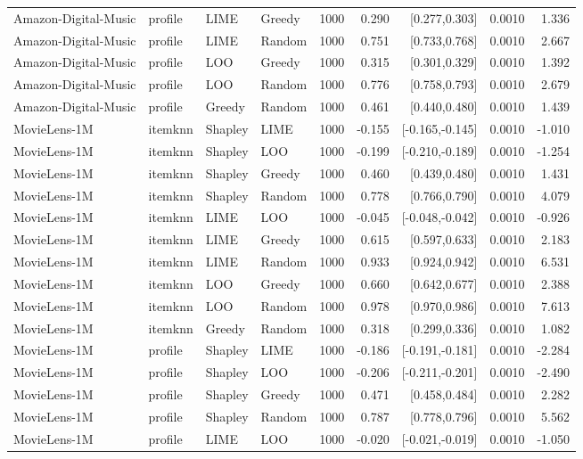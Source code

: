 \begin{table}[t]
\begin{tabular}{@{}llllrrrrr@{}}
Amazon-Digital-Music & profile & LIME & Greedy & 1000 & 0.290 & [0.277,0.303] & 0.0010 & 1.336 \\
Amazon-Digital-Music & profile & LIME & Random & 1000 & 0.751 & [0.733,0.768] & 0.0010 & 2.667 \\
Amazon-Digital-Music & profile & LOO & Greedy & 1000 & 0.315 & [0.301,0.329] & 0.0010 & 1.392 \\
Amazon-Digital-Music & profile & LOO & Random & 1000 & 0.776 & [0.758,0.793] & 0.0010 & 2.679 \\
Amazon-Digital-Music & profile & Greedy & Random & 1000 & 0.461 & [0.440,0.480] & 0.0010 & 1.439 \\
MovieLens-1M & itemknn & Shapley & LIME & 1000 & -0.155 & [-0.165,-0.145] & 0.0010 & -1.010 \\
MovieLens-1M & itemknn & Shapley & LOO & 1000 & -0.199 & [-0.210,-0.189] & 0.0010 & -1.254 \\
MovieLens-1M & itemknn & Shapley & Greedy & 1000 & 0.460 & [0.439,0.480] & 0.0010 & 1.431 \\
MovieLens-1M & itemknn & Shapley & Random & 1000 & 0.778 & [0.766,0.790] & 0.0010 & 4.079 \\
MovieLens-1M & itemknn & LIME & LOO & 1000 & -0.045 & [-0.048,-0.042] & 0.0010 & -0.926 \\
MovieLens-1M & itemknn & LIME & Greedy & 1000 & 0.615 & [0.597,0.633] & 0.0010 & 2.183 \\
MovieLens-1M & itemknn & LIME & Random & 1000 & 0.933 & [0.924,0.942] & 0.0010 & 6.531 \\
MovieLens-1M & itemknn & LOO & Greedy & 1000 & 0.660 & [0.642,0.677] & 0.0010 & 2.388 \\
MovieLens-1M & itemknn & LOO & Random & 1000 & 0.978 & [0.970,0.986] & 0.0010 & 7.613 \\
MovieLens-1M & itemknn & Greedy & Random & 1000 & 0.318 & [0.299,0.336] & 0.0010 & 1.082 \\
MovieLens-1M & profile & Shapley & LIME & 1000 & -0.186 & [-0.191,-0.181] & 0.0010 & -2.284 \\
MovieLens-1M & profile & Shapley & LOO & 1000 & -0.206 & [-0.211,-0.201] & 0.0010 & -2.490 \\
MovieLens-1M & profile & Shapley & Greedy & 1000 & 0.471 & [0.458,0.484] & 0.0010 & 2.282 \\
MovieLens-1M & profile & Shapley & Random & 1000 & 0.787 & [0.778,0.796] & 0.0010 & 5.562 \\
MovieLens-1M & profile & LIME & LOO & 1000 & -0.020 & [-0.021,-0.019] & 0.0010 & -1.050 \\

\end{tabular}
\end{table}
